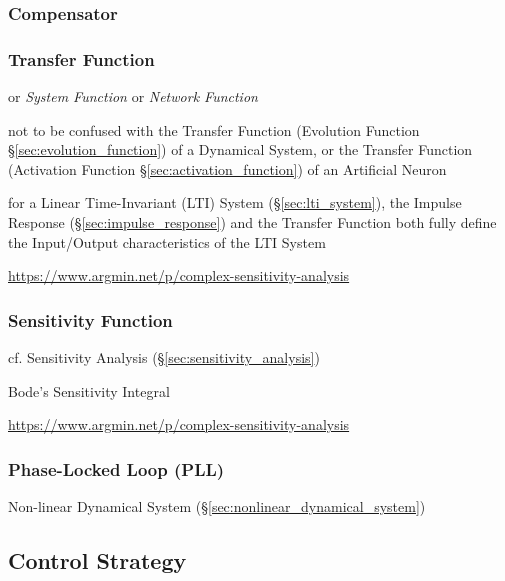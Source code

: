 \subsubsection{Compensator}\label{sec:compensator}

\subsubsection{Transfer Function}\label{sec:transfer_function}

or \emph{System Function} or \emph{Network Function}

not to be confused with the Transfer Function (Evolution Function
\S\ref{sec:evolution_function}) of a Dynamical System, or the Transfer Function
(Activation Function \S\ref{sec:activation_function}) of an Artificial Neuron

for a Linear Time-Invariant (LTI) System (\S\ref{sec:lti_system}), the Impulse
Response (\S\ref{sec:impulse_response}) and the Transfer Function both fully
define the Input/Output characteristics of the LTI System

\url{https://www.argmin.net/p/complex-sensitivity-analysis}



\subsubsection{Sensitivity Function}\label{sec:sensitivity_function}

cf. Sensitivity Analysis (\S\ref{sec:sensitivity_analysis})

Bode's Sensitivity Integral

\url{https://www.argmin.net/p/complex-sensitivity-analysis}



\subsubsection{Phase-Locked Loop (PLL)}\label{sec:pll}

Non-linear Dynamical System (\S\ref{sec:nonlinear_dynamical_system})



\subsection{Control Strategy}\label{sec:control_strategy}

